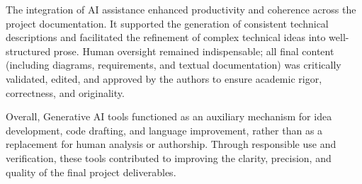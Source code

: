 The integration of AI assistance enhanced productivity and coherence across the project documentation. It supported the generation of consistent technical descriptions and facilitated the refinement of complex technical ideas into well-structured prose. Human oversight remained indispensable; all final content (including diagrams, requirements, and textual documentation) was critically validated, edited, and approved by the authors to ensure academic rigor, correctness, and originality.

Overall, Generative AI tools functioned as an auxiliary mechanism for idea development, code drafting, and language improvement, rather than as a replacement for human analysis or authorship. Through responsible use and verification, these tools contributed to improving the clarity, precision, and quality of the final project deliverables.
